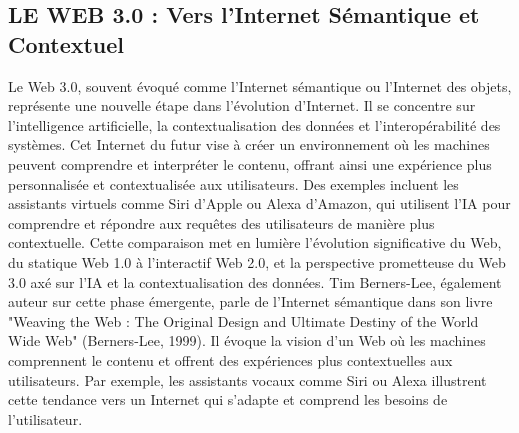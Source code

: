 \documentclass[12pt,a4paper]{article} %
\begin{document}
	\subsection{\textbf{LE WEB 3.0 : Vers l'Internet Sémantique et Contextuel}}
	Le Web 3.0, souvent évoqué comme l'Internet sémantique ou l'Internet des objets, représente une nouvelle étape dans l'évolution d'Internet. Il se concentre sur l'intelligence artificielle, la contextualisation des données et l'interopérabilité des systèmes.
	Cet Internet du futur vise à créer un environnement où les machines peuvent comprendre et interpréter le contenu, offrant ainsi une expérience plus personnalisée et contextualisée aux utilisateurs. Des exemples incluent les assistants virtuels comme Siri d'Apple ou Alexa d'Amazon, qui utilisent l'IA pour comprendre et répondre aux requêtes des utilisateurs de manière plus contextuelle. Cette comparaison met en lumière l'évolution significative du Web, du statique Web 1.0 à l'interactif Web 2.0, et la perspective prometteuse du Web 3.0 axé sur l'IA et la contextualisation des données. 
	Tim Berners-Lee, également auteur sur cette phase émergente, parle de l'Internet sémantique dans son livre "Weaving the Web : The Original Design and Ultimate Destiny of the World Wide Web" (Berners-Lee, 1999). Il évoque la vision d'un Web où les machines comprennent le contenu et offrent des expériences plus contextuelles aux utilisateurs. Par exemple, les assistants vocaux comme Siri ou Alexa illustrent cette tendance vers un Internet qui s'adapte et comprend les besoins de l'utilisateur.
	
	\printbibliography
	
\end{document}
